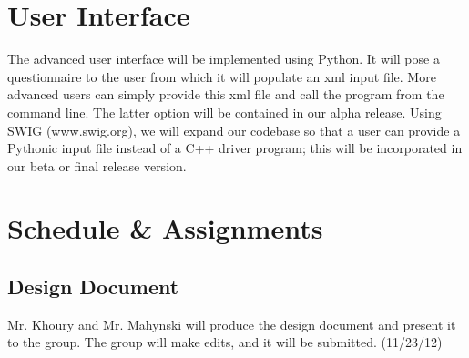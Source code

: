 \documentclass[10pt]{article}
\begin{document}
\section{User Interface}
The advanced user interface will be implemented using Python. It will pose a questionnaire to the user from which it will populate an xml input file.  More advanced users can simply provide this xml file and call the program from the command line.  The latter option will be contained in our alpha release.  Using SWIG (www.swig.org), we will expand our codebase so that a user can provide a Pythonic input file instead of a C++ driver program; this will be incorporated in our beta or final release version.


\section{Schedule \& Assignments}
\subsection{Design Document}
Mr. Khoury and Mr. Mahynski will produce the design document and present it to the group. The group will make edits, and it will be submitted. (11/23/12)
\end{document}
